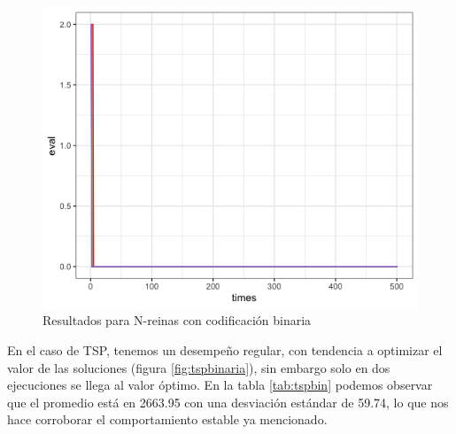\documentclass[letterpaper,12pt]{article}
\theoremstyle{definition}
\begin{document}
\begin{figure}[H]
  
  \includegraphics[width=\linewidth]{bin_nq}
  \caption{Resultados para N-reinas con codificación binaria}
  \label{fig:nqbinaria}
\end{figure}

En el caso de TSP, tenemos un desempeño regular, con tendencia a optimizar el valor de las soluciones (figura \ref{fig:tspbinaria}), sin embargo solo en dos ejecuciones se llega al valor óptimo. En la tabla \ref{tab:tspbin} podemos observar que el promedio está en 2663.95 con una desviación estándar de 59.74, lo que nos hace corroborar el comportamiento estable ya mencionado.
\end{document}
